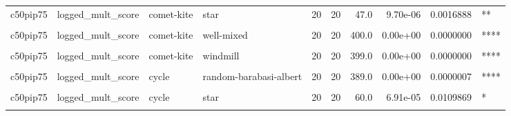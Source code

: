 \documentclass[
]{book}
\begin{document}
\begin{table}
\begin{tabular}{l|l|l|l|r|r|r|r|r|l}
\hline
\cellcolor{gray!6}{c50pip75} & \cellcolor{gray!6}{logged\_mult\_score} & \cellcolor{gray!6}{comet-kite} & \cellcolor{gray!6}{random-waxman} & \cellcolor{gray!6}{20} & \cellcolor{gray!6}{20} & \cellcolor{gray!6}{397.0} & \cellcolor{gray!6}{0.00e+00} & \cellcolor{gray!6}{0.0000000} & \cellcolor{gray!6}{****}\\
\hline
c50pip75 & logged\_mult\_score & comet-kite & star & 20 & 20 & 47.0 & 9.70e-06 & 0.0016888 & **\\
\hline
\cellcolor{gray!6}{c50pip75} & \cellcolor{gray!6}{logged\_mult\_score} & \cellcolor{gray!6}{comet-kite} & \cellcolor{gray!6}{toroidal-lattice} & \cellcolor{gray!6}{20} & \cellcolor{gray!6}{20} & \cellcolor{gray!6}{388.0} & \cellcolor{gray!6}{0.00e+00} & \cellcolor{gray!6}{0.0000010} & \cellcolor{gray!6}{****}\\
\hline
c50pip75 & logged\_mult\_score & comet-kite & well-mixed & 20 & 20 & 400.0 & 0.00e+00 & 0.0000000 & ****\\
\hline
\cellcolor{gray!6}{c50pip75} & \cellcolor{gray!6}{logged\_mult\_score} & \cellcolor{gray!6}{comet-kite} & \cellcolor{gray!6}{wheel} & \cellcolor{gray!6}{20} & \cellcolor{gray!6}{20} & \cellcolor{gray!6}{102.0} & \cellcolor{gray!6}{7.00e-03} & \cellcolor{gray!6}{0.8400000} & \cellcolor{gray!6}{ns}\\
\hline
c50pip75 & logged\_mult\_score & comet-kite & windmill & 20 & 20 & 399.0 & 0.00e+00 & 0.0000000 & ****\\
\hline
\cellcolor{gray!6}{c50pip75} & \cellcolor{gray!6}{logged\_mult\_score} & \cellcolor{gray!6}{cycle} & \cellcolor{gray!6}{linear-chain} & \cellcolor{gray!6}{20} & \cellcolor{gray!6}{20} & \cellcolor{gray!6}{195.0} & \cellcolor{gray!6}{9.04e-01} & \cellcolor{gray!6}{1.0000000} & \cellcolor{gray!6}{ns}\\
\hline
c50pip75 & logged\_mult\_score & cycle & random-barabasi-albert & 20 & 20 & 389.0 & 0.00e+00 & 0.0000007 & ****\\
\hline
\cellcolor{gray!6}{c50pip75} & \cellcolor{gray!6}{logged\_mult\_score} & \cellcolor{gray!6}{cycle} & \cellcolor{gray!6}{random-waxman} & \cellcolor{gray!6}{20} & \cellcolor{gray!6}{20} & \cellcolor{gray!6}{398.0} & \cellcolor{gray!6}{0.00e+00} & \cellcolor{gray!6}{0.0000000} & \cellcolor{gray!6}{****}\\
\hline
c50pip75 & logged\_mult\_score & cycle & star & 20 & 20 & 60.0 & 6.91e-05 & 0.0109869 & *\\
\hline
\cellcolor{gray!6}{c50pip75} & \cellcolor{gray!6}{logged\_mult\_score} & \cellcolor{gray!6}{cycle} & \cellcolor{gray!6}{toroidal-lattice} & \cellcolor{gray!6}{20} & \cellcolor{gray!6}{20} & \cellcolor{gray!6}{389.0} & \cellcolor{gray!6}{0.00e+00} & \cellcolor{gray!6}{0.0000007} & \cellcolor{gray!6}{****}\\

\end{tabular}
\end{table}
\end{document}
